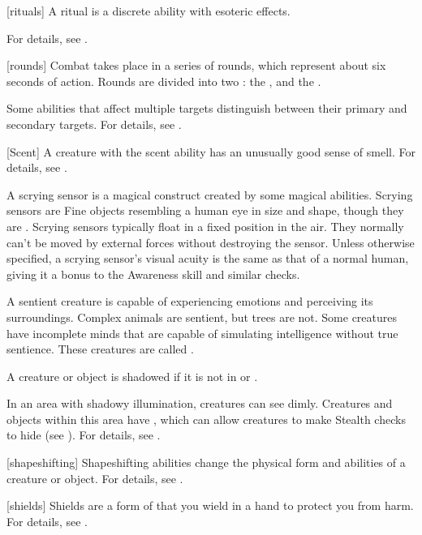 [rituals] A ritual is a discrete \magical ability with esoteric effects.

For details, see .

[rounds] Combat takes place in a series of rounds, which represent about six seconds of action.
Rounds are divided into two : the , and the .

 Some abilities that affect multiple targets distinguish between their primary and secondary targets.
For details, see .

[Scent] A creature with the scent ability has an unusually good sense of smell.
For details, see .

 A scrying sensor is a magical construct created by some magical abilities.
Scrying sensors are Fine objects resembling a human eye in size and shape, though they are .
Scrying sensors typically float in a fixed position in the air.
They normally can't be moved by external forces without destroying the sensor.
Unless otherwise specified, a scrying sensor's visual acuity is the same as that of a normal human, giving it a  bonus to the Awareness skill and similar checks.

 A sentient creature is capable of experiencing emotions and perceiving its surroundings.
Complex animals are sentient, but trees are not.
Some creatures have incomplete minds that are capable of simulating intelligence without true sentience.
These creatures are called .

 A creature or object is shadowed if it is not in  or .

 In an area with shadowy illumination, creatures can see dimly.
Creatures and objects within this area have , which can allow creatures to make Stealth checks to hide (see ).
For details, see .

[shapeshifting] Shapeshifting abilities change the physical form and abilities of a creature or object.
For details, see .

[shields] Shields are a form of  that you wield in a hand to protect you from harm.
For details, see .


